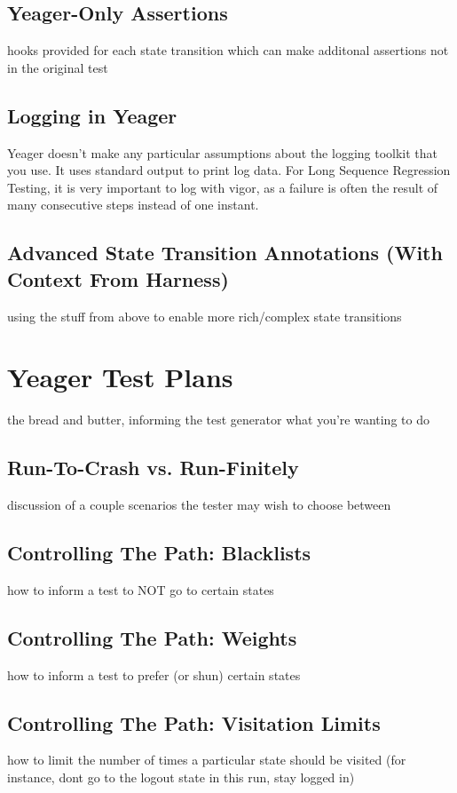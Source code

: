 \subsection{Yeager-Only Assertions}
hooks provided for each state transition which can make additonal assertions not in the original test %

\subsection{Logging in Yeager}
Yeager doesn't make any particular assumptions about the logging toolkit that you use. It uses standard output to print log data. For Long Sequence Regression Testing, it is very important to log with vigor, as a failure is often the result of many consecutive steps instead of one instant. %

\subsection{Advanced State Transition Annotations (With Context From Harness)}
using the stuff from above to enable more rich/complex state transitions %

\section{Yeager Test Plans}
the bread and butter, informing the test generator what you're wanting to do %

\subsection{Run-To-Crash vs. Run-Finitely}
discussion of a couple scenarios the tester may wish to choose between %

\subsection{Controlling The Path: Blacklists}
how to inform a test to NOT go to certain states %

\subsection{Controlling The Path: Weights}
how to inform a test to prefer (or shun) certain states %

\subsection{Controlling The Path: Visitation Limits}
how to limit the number of times a particular state should be visited (for instance, dont go to the logout state in this run, stay logged in) %


